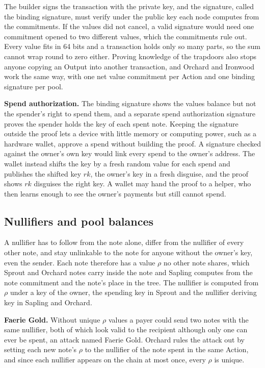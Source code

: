 \documentclass{article}
\newcommand{\lsubsection}[2]{\def\sectionlabel{#2} \subsection{#1}\label{#2}}
\theoremstyle{labelledtheorem} %
\begin{document}
The builder signs the transaction with the private key, and the signature, called the binding signature, must verify under the public key each node computes from the commitments. If the values did not cancel, a valid signature would need one commitment opened to two different values, which the commitments rule out. Every value fits in 64 bits and a transaction holds only so many parts, so the sum cannot wrap round to zero either. Proving knowledge of the trapdoors also stops anyone copying an Output into another transaction, and Orchard and Ironwood work the same way, with one net value commitment per Action and one binding signature per pool.

\textbf{Spend authorization.} The binding signature shows the values balance but not the spender's right to spend them, and a separate spend authorization signature proves the spender holds the key of each spent note. Keeping the signature outside the proof lets a device with little memory or computing power, such as a hardware wallet, approve a spend without building the proof. A signature checked against the owner's own key would link every spend to the owner's address. The wallet instead shifts the key by a fresh random value for each spend and publishes the shifted key $\mathit{rk}$, the owner's key in a fresh disguise, and the proof shows $\mathit{rk}$ disguises the right key. A wallet may hand the proof to a helper, who then learns enough to see the owner's payments but still cannot spend.

\lsubsection{Nullifiers and pool balances}{readablenullifiers}
\label{rhoandnullifiers}%

A nullifier has to follow from the note alone, differ from the nullifier of every other note, and stay unlinkable to the note for anyone without the owner's key, even the sender. Each note therefore has a value $\rho$ no other note shares, which Sprout and Orchard notes carry inside the note and Sapling computes from the note commitment and the note's place in the tree. The nullifier is computed from $\rho$ under a key of the owner, the spending key in Sprout and the nullifier deriving key in Sapling and Orchard.

\textbf{Faerie Gold.} Without unique $\rho$ values a payer could send two notes with the same nullifier, both of which look valid to the recipient although only one can ever be spent, an attack named Faerie Gold. Orchard rules the attack out by setting each new note's $\rho$ to the nullifier of the note spent in the same Action, and since each nullifier appears on the chain at most once, every $\rho$ is unique.
\end{document}
